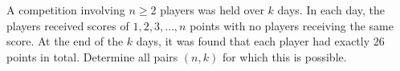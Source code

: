 A competition involving $n\ge 2$ players was held over $k$ days. In each day, the players received scores of $1,2,3,\ldots , n$ points with no players receiving the same score. At the end of the $k$ days, it was found that each player had exactly $26$ points in total. Determine all pairs $(n,k)$ for which this is possible.